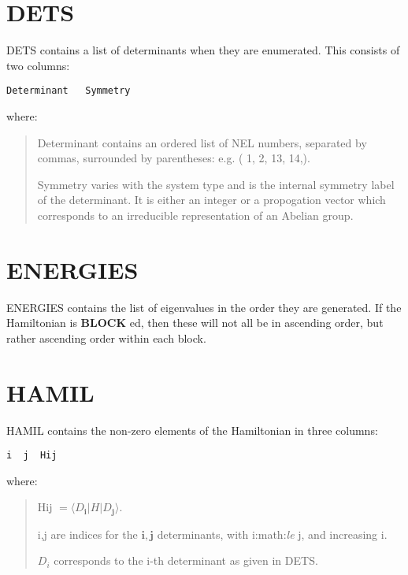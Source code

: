 \documentclass[openany,a4paper,10pt]{manual}
\newcommand{\bra}{\ensuremath{\langle}}
\newcommand{\ket}{\ensuremath{\rangle}}
\newcommand{\veci}{\ensuremath{\mathbf{i}}}
\newcommand{\vecj}{\ensuremath{\mathbf{j}}}
\begin{document}
\resetcurrentobjects


\hypertarget{output-dets}{}\section{DETS}

DETS contains a list of determinants when they are enumerated.  This consists of two columns:

\begin{Verbatim}[commandchars=@\[\]]
Determinant   Symmetry
\end{Verbatim}

where:
\begin{quote}

Determinant contains an ordered list of NEL numbers, separated by commas,
surrounded by parentheses:  e.g. (    1,    2,   13,   14,).

Symmetry varies with the system type and is the internal symmetry label of the
determinant.  It is either an integer or a propogation vector which corresponds
to an irreducible representation of an Abelian group.
\end{quote}

\resetcurrentobjects


\hypertarget{output-energies}{}\section{ENERGIES}

ENERGIES contains the list of eigenvalues in the order they are generated.  If the
Hamiltonian is \textbf{BLOCK} ed, then these will not all be in ascending order, but
rather ascending order within each block.

\resetcurrentobjects


\hypertarget{output-hamil}{}\section{HAMIL}

HAMIL contains the non-zero elements of the Hamiltonian in three columns:

\begin{Verbatim}[commandchars=@\[\]]
i  j  Hij
\end{Verbatim}

where:
\begin{quote}

Hij $=\bra D_{\veci} | H | D_{\vecj} \ket$.

i,j are indices for the $\veci,\vecj$ determinants, with i:math:\emph{le}
j, and increasing i.

$D_i$ corresponds to the i-th determinant as given in DETS.
\end{quote}
\end{document}
